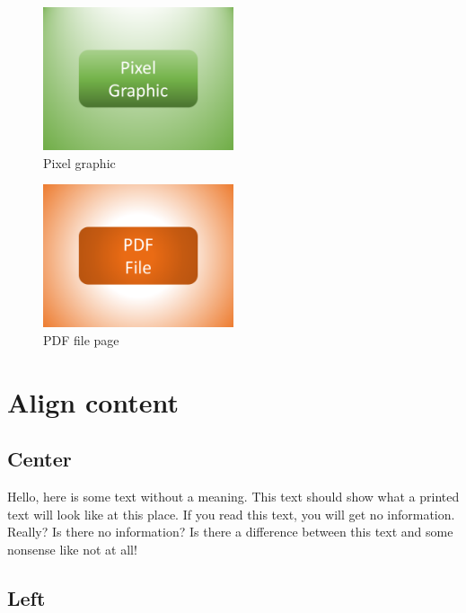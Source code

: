 \documentclass{article}				%
\begin{document}
\begin{figure}[ht]
	\centering
	\includegraphics[width=0.5\textwidth]{example-resource-pixel-graphic.png}
	\caption{Pixel graphic}
	\label{fig:pixelGraphic}
\end{figure}

\begin{figure}[ht]
	\centering
	\includegraphics[width=0.5\textwidth]{example-resource-pdf-file.pdf}
	\caption{PDF file page}
	\label{fig:pdfFile}
\end{figure}

\section{Align content}

\subsection{Center}

\begin{center}
	Hello, here is some text without a meaning.  This text should show what 
	a printed text will look like at this place.  If you read this text, 
	you will get no information.  Really?  Is there no information?  Is there 
	a difference between this text and some nonsense like not at all!
\end{center}

\subsection{Left}
\end{document}
